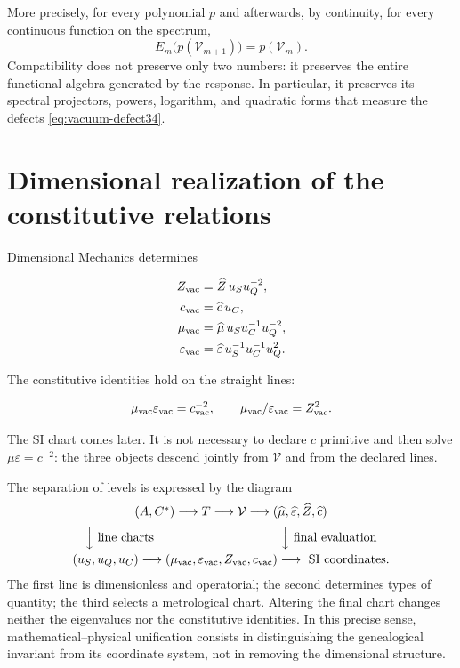 More precisely, for every polynomial \(p\) and afterwards, by continuity,
for every continuous function on the spectrum,
\begin{equation}
E_m\bigl(p(\mathcal V_{m+1})\bigr)=p(\mathcal V_m).
\label{eq:vacuum-functional-refinement}
\end{equation}
Compatibility does not preserve only two numbers: it preserves the entire
functional algebra generated by the response. In particular, it preserves its
spectral projectors, powers, logarithm, and quadratic forms
that measure the defects \cref{eq:vacuum-defect34}.

\section{Dimensional realization of the constitutive relations}

Dimensional Mechanics determines

\begin{align}
Z_{\rm vac}&=\widehat Z\,u_Su_Q^{-2},\\
c_{\rm vac}&=\widehat c\,u_C,\\
\mu_{\rm vac}&=\widehat\mu\,u_Su_C^{-1}u_Q^{-2},\\
\varepsilon_{\rm vac}&=\widehat\varepsilon\,u_S^{-1}u_C^{-1}u_Q^2.
\label{eq:vacuum-sections}
\end{align}

The constitutive identities hold on the straight lines:

\begin{equation}
\mu_{\rm vac}\varepsilon_{\rm vac}=c_{\rm vac}^{-2},
\qquad
\mu_{\rm vac}/\varepsilon_{\rm vac}=Z_{\rm vac}^2.
\end{equation}

The SI chart comes later. It is not necessary to declare \(c\) primitive and then solve \(\mu\varepsilon=c^{-2}\): the three objects descend jointly from \(\mathcal V\) and from the declared lines.

The separation of levels is expressed by the diagram
\[
\begin{array}{c}
(A,C^*)\longrightarrow T\longrightarrow\mathcal V
\longrightarrow
(\widehat\mu,\widehat\varepsilon,\widehat Z,\widehat c)
\\[2mm]
\Big\downarrow\text{ line charts}\hspace{36mm}
\Big\downarrow\text{ final evaluation}
\\[2mm]
(u_S,u_Q,u_C)\longrightarrow
(\mu_{\rm vac},\varepsilon_{\rm vac},Z_{\rm vac},c_{\rm vac})
\longrightarrow\text{ SI coordinates}.
\end{array}
\]
The first line is dimensionless and operatorial; the second determines types of
quantity; the third selects a metrological chart. Altering the final chart
changes neither the eigenvalues nor the constitutive identities. In this
precise sense, mathematical--physical unification consists in distinguishing
the genealogical invariant from its coordinate system, not in removing the
dimensional structure.

